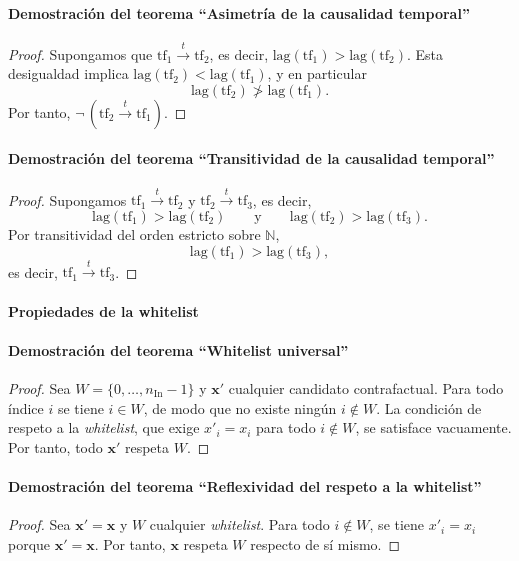 \documentclass[12pt]{report} %
\begin{document}
\paragraph*{Demostración del teorema ``Asimetría de la causalidad temporal''}
\begin{proof}
    Supongamos que $\mathrm{tf}_1 \xrightarrow{t} \mathrm{tf}_2$, es decir, $\mathrm{lag}(\mathrm{tf}_1) > \mathrm{lag}(\mathrm{tf}_2)$. Esta desigualdad implica $\mathrm{lag}(\mathrm{tf}_2) < \mathrm{lag}(\mathrm{tf}_1)$, y en particular
    $$\mathrm{lag}(\mathrm{tf}_2) \ngtr \mathrm{lag}(\mathrm{tf}_1).$$
    Por tanto, $\neg\,(\mathrm{tf}_2 \xrightarrow{t} \mathrm{tf}_1)$.
\end{proof}

\paragraph*{Demostración del teorema ``Transitividad de la causalidad temporal''}
\begin{proof}
    Supongamos $\mathrm{tf}_1 \xrightarrow{t} \mathrm{tf}_2$ y $\mathrm{tf}_2 \xrightarrow{t} \mathrm{tf}_3$, es decir,
    $$\mathrm{lag}(\mathrm{tf}_1) > \mathrm{lag}(\mathrm{tf}_2) \qquad \text{y} \qquad \mathrm{lag}(\mathrm{tf}_2) > \mathrm{lag}(\mathrm{tf}_3).$$
    Por transitividad del orden estricto sobre $\mathbb{N}$,
    $$\mathrm{lag}(\mathrm{tf}_1) > \mathrm{lag}(\mathrm{tf}_3),$$
    es decir, $\mathrm{tf}_1 \xrightarrow{t} \mathrm{tf}_3$.
\end{proof}

\paragraph*{Propiedades de la whitelist}

\paragraph*{Demostración del teorema ``Whitelist universal''}
\begin{proof}
    Sea $W = \{0, \ldots, n_{\text{In}}-1\}$ y $\mathbf{x}'$ cualquier candidato contrafactual. Para todo índice $i$ se tiene $i \in W$, de modo que no existe ningún $i \notin W$. La condición de respeto a la \textit{whitelist}, que exige $x'_i = x_i$ para todo $i \notin W$, se satisface vacuamente. Por tanto, todo $\mathbf{x}'$ respeta $W$.
\end{proof}

\paragraph*{Demostración del teorema ``Reflexividad del respeto a la whitelist''}
\begin{proof}
    Sea $\mathbf{x}' = \mathbf{x}$ y $W$ cualquier \textit{whitelist}. Para todo $i \notin W$, se tiene $x'_i = x_i$ porque $\mathbf{x}' = \mathbf{x}$. Por tanto, $\mathbf{x}$ respeta $W$ respecto de sí mismo.
\end{proof}
\end{document}
